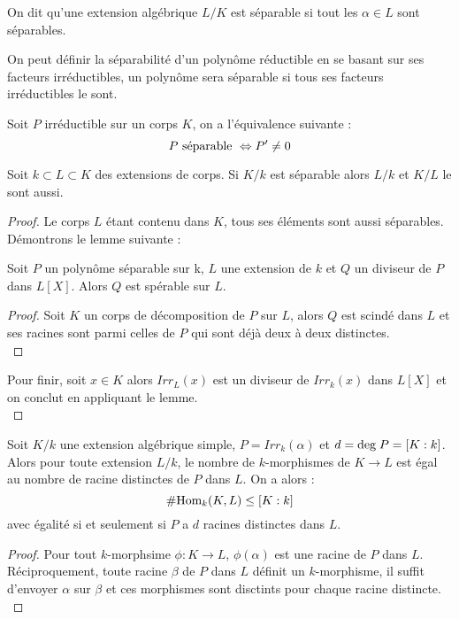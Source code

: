 \documentclass[a4paper]{article} %
\numberwithin{section}{part}
\numberwithin{equation}{section}
\begin{document}
\begin{defn}
\label{defsep}
On dit qu'une extension algébrique $L/K$ est séparable si tout les $\alpha\in L$
sont séparables.
\end{defn}

\begin{rem}
On peut définir la séparabilité d'un polynôme réductible en se basant sur ses
facteurs irréductibles, un polynôme sera séparable si tous ses facteurs
irréductibles le sont.
\end{rem}

\begin{prop}
\label{sepder}
Soit $P$ irréductible sur un corps $K$, on a l'équivalence suivante :
\[P\textup{ séparable } \Leftrightarrow P'\neq 0\]
\end{prop}

\begin{prop}
Soit $k \subset L \subset K$ des extensions de corps. Si $K/k$ est séparable
alors $L/k$ et $K/L$ le sont aussi.
\end{prop}
\begin{proof}
Le corps $L$ étant contenu dans $K$, tous ses éléments sont aussi séparables.
Démontrons le lemme suivante :
\begin{lem}
\label{divsep}
Soit $P$ un polynôme séparable sur k, $L$ une extension de $k$ et $Q$ un
diviseur de $P$ dans $L[X]$. Alors $Q$ est spérable sur $L$.
\end{lem}
\begin{proof}
Soit $K$ un corps de décomposition de $P$ sur $L$, alors $Q$ est scindé dans $L$
et ses racines sont parmi celles de $P$ qui sont déjà deux à deux distinctes.\\
\end{proof}
Pour finir, soit $x\in K$ alors $Irr_L(x)$ est un diviseur de $Irr_k(x)$ dans
$L[X]$ et on conclut en appliquant le lemme.\\
\end{proof}

\begin{prop}
\label{nbautroot}
Soit $K/k$ une extension algébrique simple, $P = Irr_k(\alpha)$ et $d =
\textup{deg\;}P = [K:k]$. Alors pour toute extension $L/k$, le nombre de
$k$-morphismes de $K \to L$ est égal au nombre de racine distinctes de $P$ dans
$L$. On a alors :
\[\#\textup{Hom}_k(K,L)\leq[K:k]\]
avec égalité si et seulement si $P$ a $d$ racines distinctes dans $L$.
\end{prop}
\begin{proof}
Pour tout $k$-morphsime $\phi : K\to L$, $\phi(\alpha)$ est une racine de $P$
dans $L$. Réciproquement, toute racine $\beta$ de $P$ dans $L$ définit un
$k$-morphisme, il suffit d'envoyer $\alpha$ sur $\beta$ et ces morphismes sont
disctints pour chaque racine distincte.\\
\end{proof}
\end{document}
